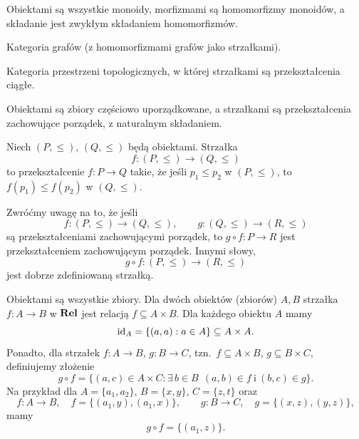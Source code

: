 \begin{przyklad}
Obiektami są wszystkie monoidy, morfizmami są homomorfizmy monoidów, a składanie jest zwykłym składaniem homomorfizmów.
\end{przyklad}

\begin{przyklad}
Kategoria grafów (z homomorfizmami grafów jako strzałkami).
\end{przyklad}

\begin{przyklad}[$\Top$]
Kategoria przestrzeni topologicznych, w której strzałkami są przekształcenia ciągłe.
\end{przyklad}

\begin{przyklad}[$\Pos$]
Obiektami są zbiory częściowo uporządkowane, a strzałkami są przekształcenia zachowujące porządek, z naturalnym składaniem.

Niech $(P, \le)$, $(Q, \le)$ będą obiektami. Strzałka
\[
f \colon (P, \le) \longrightarrow (Q, \le)
\]
to przekształcenie $f \colon P \to Q$ takie, że jeśli $p_1 \le p_2$ w $(P, \le)$, to $f(p_1) \le f(p_2)$ w $(Q, \le)$.

Zwróćmy uwagę na to, że jeśli
\[
f \colon (P, \le) \longrightarrow (Q, \le), \qquad g \colon (Q, \le) \longrightarrow (R, \le)
\]
są przekształceniami zachowującymi porządek, to $g \circ f \colon P \to R$ jest przekształceniem zachowującym porządek. Innymi słowy,
\[
g \circ f \colon (P, \le) \longrightarrow (R, \le)
\]
jest dobrze zdefiniowaną strzałką.
\end{przyklad}

\begin{przyklad}[$\Rel$]
Obiektami są wszystkie zbiory. Dla dwóch obiektów (zbiorów) $A, B$ strzałka $f \colon A \to B$ w $\Rel$ jest relacją $f \subseteq A \times B$. Dla każdego obiektu $A$ mamy
\[
\mathrm{id}_A = \{(a, a) : a \in A\} \subseteq A \times A.
\]
Ponadto, dla strzałek $f \colon A \to B$, $g \colon B \to C$, tzn.\ $f \subseteq A \times B$, $g \subseteq B \times C$, definiujemy złożenie
\[
g \circ f = \bigl\{(a, c) \in A \times C : \exists\, b \in B\ \ (a,b) \in f \ \text{i}\ (b,c) \in g \bigr\}.
\]
Na przykład dla $A = \{a_1, a_2\}$, $B = \{x, y\}$, $C = \{z, t\}$ oraz
\[
f \colon A \to B, \quad f = \{(a_1, y), (a_1, x)\}, \qquad g \colon B \to C, \quad g = \{(x, z), (y, z)\},
\]
mamy
\[
g \circ f = \{(a_1, z)\}.
\]
\end{przyklad}

